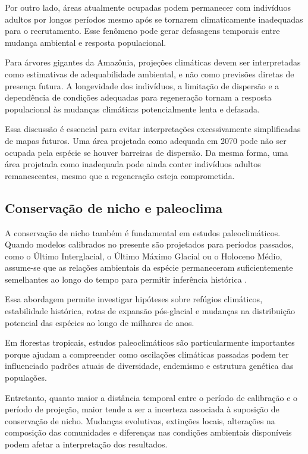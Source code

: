 Por outro lado, áreas atualmente ocupadas podem permanecer com indivíduos adultos por longos períodos mesmo após se tornarem climaticamente inadequadas para o recrutamento. Esse fenômeno pode gerar defasagens temporais entre mudança ambiental e resposta populacional.

\begin{aplicacao}
	Para árvores gigantes da Amazônia, projeções climáticas devem ser interpretadas como estimativas de adequabilidade ambiental, e não como previsões diretas de presença futura. A longevidade dos indivíduos, a limitação de dispersão e a dependência de condições adequadas para regeneração tornam a resposta populacional às mudanças climáticas potencialmente lenta e defasada.
\end{aplicacao}

Essa discussão é essencial para evitar interpretações excessivamente simplificadas de mapas futuros. Uma área projetada como adequada em 2070 pode não ser ocupada pela espécie se houver barreiras de dispersão. Da mesma forma, uma área projetada como inadequada pode ainda conter indivíduos adultos remanescentes, mesmo que a regeneração esteja comprometida.

\subsection{Conservação de nicho e paleoclima}

A conservação de nicho também é fundamental em estudos paleoclimáticos. Quando modelos calibrados no presente são projetados para períodos passados, como o Último Interglacial, o Último Máximo Glacial ou o Holoceno Médio, assume-se que as relações ambientais da espécie permaneceram suficientemente semelhantes ao longo do tempo para permitir inferência histórica \parencite{nogués-bravo2009}.

Essa abordagem permite investigar hipóteses sobre refúgios climáticos, estabilidade histórica, rotas de expansão pós-glacial e mudanças na distribuição potencial das espécies ao longo de milhares de anos.

Em florestas tropicais, estudos paleoclimáticos são particularmente importantes porque ajudam a compreender como oscilações climáticas passadas podem ter influenciado padrões atuais de diversidade, endemismo e estrutura genética das populações.

Entretanto, quanto maior a distância temporal entre o período de calibração e o período de projeção, maior tende a ser a incerteza associada à suposição de conservação de nicho. Mudanças evolutivas, extinções locais, alterações na composição das comunidades e diferenças nas condições ambientais disponíveis podem afetar a interpretação dos resultados.

